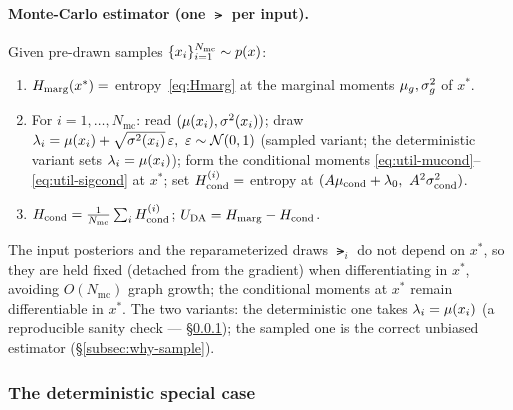 \paragraph{Monte-Carlo estimator (one $\lat$ per input).}
Given pre-drawn samples $\{x_i\}_{i=1}^{N_{\mathrm{mc}}}\sim p(x)$:
%
\begin{enumerate}\itemsep2pt
  \item $H_{\mathrm{marg}}(x^{*})=$ entropy~\eqref{eq:Hmarg} at the marginal moments
        $\mu_{g},\sigma_{g}^{2}$ of $x^{*}$.
  \item For $i=1,\dots,N_{\mathrm{mc}}$: read $(\mu(x_i),\sigma^{2}(x_i))$; draw
        $\lat_i=\pmean(x_i)+\sqrt{\pvar(x_i)}\,\varepsilon,\ \varepsilon\sim\Gauss(0,1)$
        (sampled variant; the deterministic variant sets $\lambda_i=\mu(x_i)$); form
        the conditional moments \eqref{eq:util-mucond}--\eqref{eq:util-sigcond} at
        $x^{*}$; set $H_{\mathrm{cond}}^{(i)}=$ entropy at $(\gain\mu_{\mathrm{cond}}+\latz,\ \gain^{2}\sigma^{2}_{\mathrm{cond}})$.
  \item $H_{\mathrm{cond}}=\tfrac{1}{N_{\mathrm{mc}}}\sum_iH_{\mathrm{cond}}^{(i)}$;\quad
        $U_{\mathrm{DA}}=H_{\mathrm{marg}}-H_{\mathrm{cond}}$.
\end{enumerate}
%
The input posteriors and the reparameterized draws $\lat_i$ do not depend on
$x^{*}$, so they are held fixed (detached from the gradient) when differentiating in
$x^{*}$, avoiding $O(N_{\mathrm{mc}})$ graph growth; the conditional moments at
$x^{*}$ remain differentiable in $x^{*}$. The two variants: the deterministic one
takes $\lambda_i=\mu(x_i)$ (a reproducible sanity check ---
\S\ref{subsubsec:det}); the sampled one is the correct unbiased estimator
(\S\ref{subsec:why-sample}).

\subsubsection{The deterministic special case}
\label{subsubsec:det}

